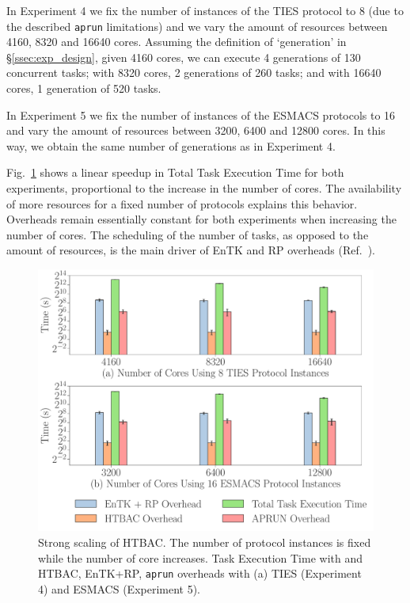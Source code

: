 
In Experiment 4 we fix the number of instances of the TIES protocol to 8 (due
to the described \texttt{aprun} limitations) and we vary the amount of
resources between 4160, 8320 and 16640 cores. Assuming the definition of
`generation' in \S\ref{ssec:exp_design}, given 4160 cores, we can execute 4
generations of 130 concurrent tasks; with 8320 cores, 2 generations of 260
tasks; and with 16640 cores, 1 generation of 520 tasks.

In Experiment 5 we fix the number of instances of the ESMACS protocols to 16
and vary the amount of resources between 3200, 6400 and 12800 cores. In this
way, we obtain the same number of generations as in Experiment 4.

Fig.~\ref{fig:ss} shows a linear speedup in Total Task Execution Time for
both experiments, proportional to the increase in the number of cores. The
availability of more resources for a fixed number of protocols explains this
behavior. Overheads remain essentially constant for both experiments when
increasing the number of cores. The scheduling of the number of tasks, as
opposed to the amount of resources, is the main driver of EnTK and RP
overheads (Ref.~\cite{merzky2018}).

\begin{figure}
  \centering
   \includegraphics[width=\columnwidth]{figures/ss_all_base2.pdf} 
   \caption{Strong scaling of HTBAC. The number of protocol instances is
    fixed while the number of core increases. Task Execution Time with and
    HTBAC, EnTK+RP, \texttt{aprun} overheads with (a) TIES (Experiment 4) and
    ESMACS (Experiment 5).}\label{fig:ss}
\up{}
\up{}
\up{}
\end{figure}

